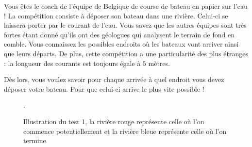 \problemname{\problemyamlname}


\newcommand{\maxn}{}

Vous êtes le coach de l'équipe de Belgique de course de bateau en papier sur l'eau ! La compétition consiste à déposer son bateau dans une rivière. Celui-ci se laissera porter par le courant de l'eau.
Vous savez que les autres équipes sont très fortes étant donné qu'ils ont des géologues qui analysent le terrain de fond en comble. Vous connaissez les possibles endroits où les bateaux vont arriver ainsi que leurs départs.
De plus, cette compétition a une particularité des plus étranges : la longueur des courants est toujours égale à $5$ mètres.

Dès lors, vous voulez savoir pour chaque arrivée à quel endroit vous devez déposer votre bateau. Pour que celui-ci arrive le plus vite possible !

\begin{figure}[h]
    \begin{center}
    \end{center}
    \caption{Illustration du test 1, la rivière rouge représente celle où l'on commence potentiellement et la rivière bleue représente celle où l'on termine}.
\end{figure}


